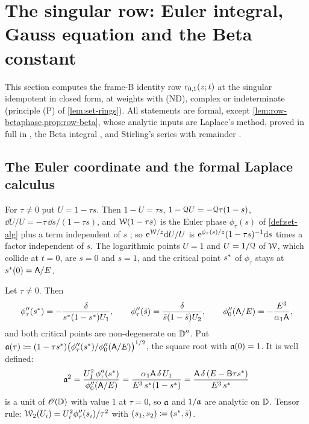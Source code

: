 \section{The singular row: Euler integral, Gauss equation and the Beta constant}
\label{sec:row}

This section computes the frame-B identity row $\mathrm{r}_{0,1}(z;t)$ at the singular idempotent in closed form, at weights with (ND), complex or indeterminate (principle (P) of \cref{lem:set-rings}). All statements are formal, except \cref{lem:row-betaphase,prop:row-beta}, whose analytic inputs are Laplace's method, proved in full in , the Beta integral \cite[5.12.1]{DLMF}, and Stirling's series with remainder \cite[5.11.1 and Section~5.11(ii)]{DLMF}.

\subsection{The Euler coordinate and the formal Laplace calculus}
\label{sec:row-euler}

For $\tau\neq0$ put $U=1-\tau s$. Then $1-U=\tau s$, $1-\mathcal{Q} U=-\mathcal{Q}\tau(1-s)$, $\dd U/U=-\tau\,\dd s/(1-\tau s)$, and $\mathcal{W}(1-\tau s)$ is the Euler phase $\phi_\tau(s)$ of \cref{def:set-alg} plus a term independent of $s$ ; so $\mathrm{e}^{\mathcal{W}/z}\mathrm{d} U/U$ is $\mathrm{e}^{\phi_\tau(s)/z}(1-\tau s)^{-1}\mathrm{d} s$ times a factor independent of $s$. The logarithmic points $U=1$ and $U=1/\mathcal{Q}$ of $\mathcal{W}$, which collide at $t=0$, are $s=0$ and $s=1$, and the critical point $s^{\ast}$ of $\phi_\tau$ stays at $s^{\ast}(0)=\mathsf{A}/E$.

\begin{lem}
\label{lem:row-hess}
Let $\tau\neq0$. Then
\begin{equation}
\label{eq:row-hess}
\phi_\tau''(s^{\ast})=-\frac{\delta}{s^{\ast}(1-s^{\ast})U_1},\qquad
\phi_\tau''(\tilde{s})=\frac{\delta}{\tilde{s}(1-\tilde{s})U_2},\qquad
\phi_0''(\mathsf{A}/E)=-\frac{E^3}{\alpha_1\mathsf{A}},
\end{equation}
and both critical points are non-degenerate on $\mathbb{D}''$. Put $\mathfrak{a}(\tau)\coloneqq(1-\tau s^{\ast})\big(\phi_\tau''(s^{\ast})/\phi_0''(\mathsf{A}/E)\big)^{1/2}$, the square root with $\mathfrak{a}(0)=1$. It is well defined:
\begin{equation}
\label{eq:row-alg}
\mathfrak{a}^2=\frac{U_1^2\,\phi_\tau''(s^{\ast})}{\phi_0''(\mathsf{A}/E)}=\frac{\alpha_1\mathsf{A}\,\delta\,U_1}{E^3\,s^{\ast}(1-s^{\ast})}=\frac{\mathsf{A}\,\delta\,(E-\mathsf{B}\tau s^{\ast})}{E^3\,s^{\ast}}
\end{equation}
is a unit of $\mathscr{O}(\mathbb{D})$ with value $1$ at $\tau=0$, so $\mathfrak{a}$ and $1/\mathfrak{a}$ are analytic on $\mathbb{D}$. Tensor rule: $\mathcal{W}_2(U_i)=U_i^2\phi_\tau''(s_i)/\tau^2$ with $(s_1,s_2)\coloneqq(s^{\ast},\tilde{s})$.
\end{lem}

